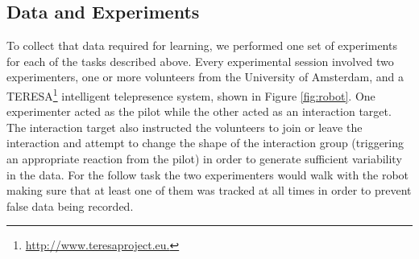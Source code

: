 \documentclass[letterpaper, 10 pt, conference]{ieeeconf}
\newcommand{\sw}[1]{\textcolor{red}{SW: #1}}
\newcommand{\ks}[1]{\textcolor{mypurp}{KS: #1}}
\begin{document}




\subsection{Data and Experiments \label{subsec:data_exp}} 

To collect that data required for learning, we performed one set of experiments for each of the tasks described above. Every experimental session involved two experimenters, one or more volunteers from the University of Amsterdam, and a TERESA\footnote{\url{http://www.teresaproject.eu.}} intelligent telepresence system, shown in Figure \ref{fig:robot}.  One experimenter acted as the pilot while the other acted as an interaction target. The interaction target also instructed the volunteers to join or leave the interaction and attempt to change the shape of the interaction group (triggering an appropriate reaction from the pilot) in order to generate sufficient variability in the data. For the follow task the two experimenters would walk with the robot making sure that at least one of them was tracked at all times in order to prevent false data being recorded.  
\end{document}
